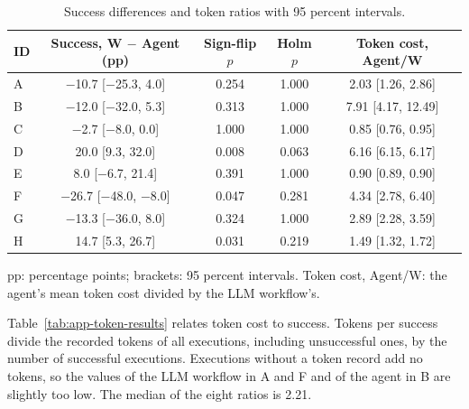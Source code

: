 \begin{table}[htbp]
\centering
\caption[Success differences and token ratios with 95 percent intervals]{Success differences and token ratios with 95 percent intervals.}
\label{tab:app-intervals}
\renewcommand{\baselinestretch}{1}
\footnotesize
\setlength{\tabcolsep}{3pt}
\renewcommand{\arraystretch}{1.08}
\begin{tabular*}{\linewidth}{@{\extracolsep{\fill}}l c c c c@{}}
\toprule
\textbf{ID} & \textbf{Success, W $-$ Agent (pp)} & \textbf{Sign-flip $p$} & \textbf{Holm $p$} & \textbf{Token cost, Agent/W} \\
\midrule
A & $-$10.7 [$-$25.3, 4.0] & 0.254 & 1.000 & 2.03 [1.26, 2.86] \\
B & $-$12.0 [$-$32.0, 5.3] & 0.313 & 1.000 & 7.91 [4.17, 12.49] \\
C & $-$2.7 [$-$8.0, 0.0] & 1.000 & 1.000 & 0.85 [0.76, 0.95] \\
D & 20.0 [9.3, 32.0] & 0.008 & 0.063 & 6.16 [6.15, 6.17] \\
E & 8.0 [$-$6.7, 21.4] & 0.391 & 1.000 & 0.90 [0.89, 0.90] \\
F & $-$26.7 [$-$48.0, $-$8.0] & 0.047 & 0.281 & 4.34 [2.78, 6.40] \\
G & $-$13.3 [$-$36.0, 8.0] & 0.324 & 1.000 & 2.89 [2.28, 3.59] \\
H & 14.7 [5.3, 26.7] & 0.031 & 0.219 & 1.49 [1.32, 1.72] \\
\bottomrule
\end{tabular*}
\par\smallskip
\begin{minipage}{\linewidth}\footnotesize
pp: percentage points; brackets: 95 percent intervals. Token cost, Agent/W: the agent's mean token cost divided by the LLM workflow's.
\end{minipage}
\end{table}

Table~\ref{tab:app-token-results} relates token cost to success. Tokens per success divide the recorded tokens of all executions, including unsuccessful ones, by the number of successful executions. Executions without a token record add no tokens, so the values of the LLM workflow in A and F and of the agent in B are slightly too low. The median of the eight ratios is 2.21.

